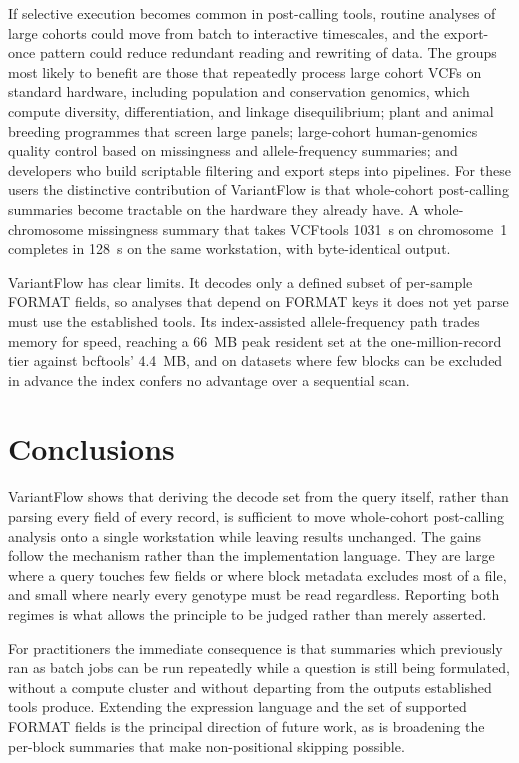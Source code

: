 If selective execution becomes common in post-calling tools, routine analyses of
large cohorts could move from batch to interactive timescales, and the
export-once pattern could reduce redundant reading and rewriting of data. The
groups most likely to benefit are those that repeatedly process large cohort
VCFs on standard hardware, including population and conservation genomics, which
compute diversity, differentiation, and linkage disequilibrium; plant and animal
breeding programmes that screen large panels; large-cohort human-genomics
quality control based on missingness and allele-frequency summaries; and
developers who build scriptable filtering and export steps into pipelines. For
these users the distinctive contribution of VariantFlow is that whole-cohort
post-calling summaries become tractable on the hardware they already have. A
whole-chromosome missingness summary that takes VCFtools 1031~s on
chromosome~1 completes in 128~s on the same workstation, with byte-identical
output.

VariantFlow has clear limits. It decodes only a defined subset of per-sample
FORMAT fields, so analyses that depend on FORMAT keys it does not yet parse must
use the established tools. Its index-assisted allele-frequency path trades
memory for speed, reaching a 66~MB peak resident set at the one-million-record
tier against bcftools' 4.4~MB, and on datasets where few blocks can be excluded
in advance the index confers no advantage over a sequential scan.

\section{Conclusions}

VariantFlow shows that deriving the decode set from the query itself, rather than
parsing every field of every record, is sufficient to move whole-cohort
post-calling analysis onto a single workstation while leaving results unchanged.
The gains follow the mechanism rather than the implementation language. They are
large where a query touches few fields or where block metadata excludes most of
a file, and small where nearly every genotype must be read regardless. Reporting
both regimes is what allows the principle to be judged rather than merely
asserted.

For practitioners the immediate consequence is that summaries which previously
ran as batch jobs can be run repeatedly while a question is still being
formulated, without a compute cluster and without departing from the outputs
established tools produce. Extending the expression language and the set of
supported FORMAT fields is the principal direction of future work, as is
broadening the per-block summaries that make non-positional skipping possible.
